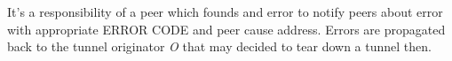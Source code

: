 \documentclass{article}
\begin{document}
It's a responsibility of a peer which founds and error to notify peers about error with appropriate ERROR CODE and peer cause address. Errors are propagated back to the tunnel originator \textit{O} that may decided to tear down a tunnel then.

\medskip
 
\nocite{torproject}
\nocite{netty}


\printbibliography
\end{document}
